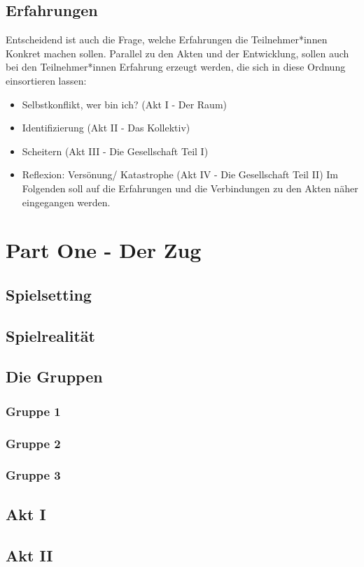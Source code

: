 \documentclass[12pt, a4paper, openany]{report}
\begin{document}
\section{Erfahrungen}
Entscheidend ist auch die Frage, welche Erfahrungen die Teilnehmer*innen Konkret machen sollen.
Parallel zu den Akten und der Entwicklung, sollen auch bei den Teilnehmer*innen Erfahrung erzeugt werden, die sich in diese Ordnung einsortieren lassen:
\begin{itemize}
\item Selbstkonflikt, wer bin ich? (Akt I - Der Raum)
\item Identifizierung (Akt II - Das Kollektiv)
\item Scheitern (Akt III - Die Gesellschaft Teil I)
\item Reflexion: Versönung/ Katastrophe (Akt IV - Die Gesellschaft Teil II)
Im Folgenden soll auf die Erfahrungen und die Verbindungen zu den Akten näher eingegangen werden.
\end{itemize}

\chapter{Part One - Der Zug}
\section{Spielsetting}
\section{Spielrealität}
\section{Die Gruppen}
\subsection{Gruppe 1}
\subsection{Gruppe 2}
\subsection{Gruppe 3}
\section{Akt I}
\section{Akt II}
\end{document}
